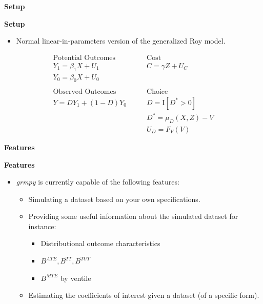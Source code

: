 \begin{frame}\begin{center}
\LARGE\textbf{Setup}
\end{center}\end{frame}



\begin{frame}
\textbf{Setup}

\medskip
\begin{itemize}\setlength\itemsep{1em}
\item Normal linear-in-parameters version of the generalized Roy model.
\end{itemize}
\begin{align*}
\text{Potential Outcomes} &\qquad \text{Cost} \\
Y_1 = \beta_1 X + U_1      &\qquad C = \gamma Z + U_C \\
Y_0 = \beta_0 X + U_0      &\qquad \\
    & \\
\text{Observed Outcomes}  &\qquad \text{Choice} \\
Y = D Y_1 + (1 - D)Y_0 &\qquad D = \mathrm{I}[D^{*} > 0] \\
                       &\qquad D^{*} = \mu_D(X, Z) - V \\
                       &\qquad U_D = F_V(V)
\end{align*}
\end{frame}

\begin{frame}\begin{center}
\LARGE\textbf{Features}
\end{center}\end{frame}

\begin{frame}
\textbf{Features}

\medskip
\begin{itemize}\setlength\itemsep{1em}
\item \textit{grmpy} is currently capable of the following features:
\begin{itemize}\setlength\itemsep{1em}
  \item Simulating a dataset based on your own specifications.
  \item Providing some useful information about the simulated dataset for instance:
  
  \medskip
    \begin{itemize}\setlength\itemsep{1em}
    \item Distributional outcome characteristics
    \item $B^{ATE}, B^{TT}, B^{TUT}$
    \item $B^{MTE}$ by ventile
    \end{itemize}
  \item Estimating the coefficients of interest given a dataset (of a specific form).
\end{itemize}
\end{itemize}

\end{frame}

